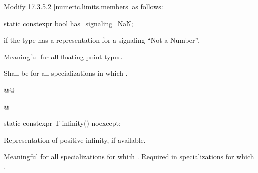 Modify 17.3.5.2 [numeric.limits.members] as follows:
\begin{wgText}
  \setcounter{Paras}{41}
\begin{itemdecl}
static constexpr bool has_signaling_NaN;
\end{itemdecl}

\begin{itemdescr}
  \pnum
   if the type has a representation for a signaling “Not a Number”.

  \pnum
  Meaningful for all floating-point types.

  \pnum
  Shall be  for all specializations in which .
\end{itemdescr}

\begin{wgBRem}
\begin{itemdecl}
@@
\end{itemdecl}

\begin{itemdescr}
  \pnum

  \pnum
\end{itemdescr}

\begin{itemdecl}
@
\end{itemdecl}

\begin{itemdescr}
  \pnum
\end{itemdescr}
\end{wgBRem}

\begin{itemdecl}
static constexpr T infinity() noexcept;
\end{itemdecl}

\begin{itemdescr}
  \pnum
  Representation of positive infinity, if available.

  \pnum
  Meaningful for all specializations for which . Required in specializations for
  which .
\end{itemdescr}


\end{wgText}
